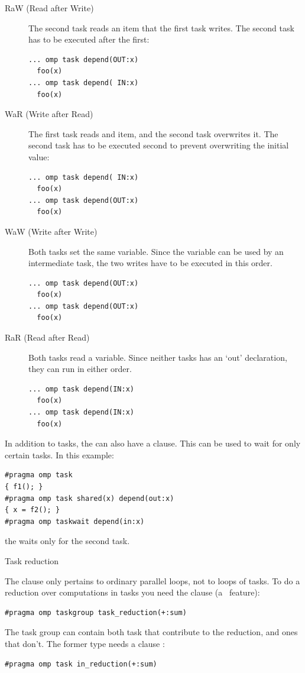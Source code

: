\begin{description}
\item[RaW (Read after Write)] The second task reads an item that the
  first task writes. The second task has to be executed after the
  first:
\begin{lstlisting}[language=omp]
... omp task depend(OUT:x)
  foo(x)
... omp task depend( IN:x)
  foo(x)
\end{lstlisting}
\item[WaR (Write after Read)] The first task reads and item, and the
  second task overwrites it. The second task has to be executed second
  to prevent overwriting the initial value:
\begin{lstlisting}[language=omp]
... omp task depend( IN:x)
  foo(x)
... omp task depend(OUT:x)
  foo(x)
\end{lstlisting}
\item[WaW (Write after Write)] Both tasks set the same variable. Since
  the variable can be used by an intermediate task, the two writes
  have to be executed in this order.
\begin{lstlisting}[language=omp]
... omp task depend(OUT:x)
  foo(x)
... omp task depend(OUT:x)
  foo(x)
\end{lstlisting}
\item[RaR (Read after Read)] Both tasks read a variable. Since neither
  tasks has an `out' declaration, they can run in either order.
\begin{lstlisting}[language=omp]
... omp task depend(IN:x)
  foo(x)
... omp task depend(IN:x)
  foo(x)
\end{lstlisting}
\end{description}

In addition to tasks, the  can also
have a  clause.
This can be used to wait for only certain tasks.
In this example:
\begin{lstlisting}[language=omp]
#pragma omp task 
{ f1(); }
#pragma omp task shared(x) depend(out:x)
{ x = f2(); }
#pragma omp taskwait depend(in:x)
\end{lstlisting}
the  waits only for the second task.

 {Task reduction}

The  clause only pertains to ordinary parallel loops,
not to  loops of tasks.
To do a reduction over computations in tasks you need the
 clause
(a~ feature):
\begin{lstlisting}[language=omp]
#pragma omp taskgroup task_reduction(+:sum)
\end{lstlisting}
The task group can contain both task that contribute to the reduction,
and ones that don't. The former type needs a clause :
\begin{lstlisting}[language=omp]
#pragma omp task in_reduction(+:sum)
\end{lstlisting}

